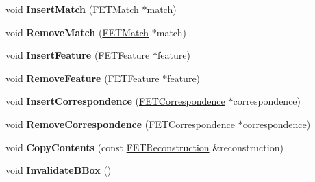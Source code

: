 \begin{DoxyCompactItemize}
\item 
void {\bfseries Insert\+Match} (\hyperlink{struct_f_e_t_match}{F\+E\+T\+Match} $\ast$match)\hypertarget{struct_f_e_t_reconstruction_a7686f6e4ecdfea90c634c3de7e170318}{}\label{struct_f_e_t_reconstruction_a7686f6e4ecdfea90c634c3de7e170318}

\item 
void {\bfseries Remove\+Match} (\hyperlink{struct_f_e_t_match}{F\+E\+T\+Match} $\ast$match)\hypertarget{struct_f_e_t_reconstruction_a36de120dbdef4ead9d117583f73d262d}{}\label{struct_f_e_t_reconstruction_a36de120dbdef4ead9d117583f73d262d}

\item 
void {\bfseries Insert\+Feature} (\hyperlink{struct_f_e_t_feature}{F\+E\+T\+Feature} $\ast$feature)\hypertarget{struct_f_e_t_reconstruction_a880c21973c66e76af982df0d793d4848}{}\label{struct_f_e_t_reconstruction_a880c21973c66e76af982df0d793d4848}

\item 
void {\bfseries Remove\+Feature} (\hyperlink{struct_f_e_t_feature}{F\+E\+T\+Feature} $\ast$feature)\hypertarget{struct_f_e_t_reconstruction_a03816dbfc1147c4941dc5b44bf1e8901}{}\label{struct_f_e_t_reconstruction_a03816dbfc1147c4941dc5b44bf1e8901}

\item 
void {\bfseries Insert\+Correspondence} (\hyperlink{struct_f_e_t_correspondence}{F\+E\+T\+Correspondence} $\ast$correspondence)\hypertarget{struct_f_e_t_reconstruction_a8c7223834efb6dbd065c620d39f2ff9a}{}\label{struct_f_e_t_reconstruction_a8c7223834efb6dbd065c620d39f2ff9a}

\item 
void {\bfseries Remove\+Correspondence} (\hyperlink{struct_f_e_t_correspondence}{F\+E\+T\+Correspondence} $\ast$correspondence)\hypertarget{struct_f_e_t_reconstruction_afcc1d4320d45354b8abb51f9ad808f82}{}\label{struct_f_e_t_reconstruction_afcc1d4320d45354b8abb51f9ad808f82}

\item 
void {\bfseries Copy\+Contents} (const \hyperlink{struct_f_e_t_reconstruction}{F\+E\+T\+Reconstruction} \&reconstruction)\hypertarget{struct_f_e_t_reconstruction_a70a36d85d9e0ccd635e27e92959d1cf2}{}\label{struct_f_e_t_reconstruction_a70a36d85d9e0ccd635e27e92959d1cf2}

\item 
void {\bfseries Invalidate\+B\+Box} ()\hypertarget{struct_f_e_t_reconstruction_a663414d23000b20b80cd42f5f706df25}{}\label{struct_f_e_t_reconstruction_a663414d23000b20b80cd42f5f706df25}


\end{DoxyCompactItemize}
